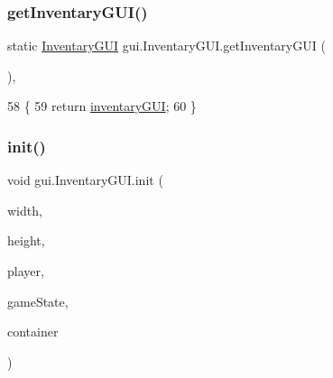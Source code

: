 \subsubsection{\texorpdfstring{get\+Inventary\+G\+U\+I()}{getInventaryGUI()}}
{\footnotesize\ttfamily static \mbox{\hyperlink{classgui_1_1_inventary_g_u_i}{Inventary\+G\+UI}} gui.\+Inventary\+G\+U\+I.\+get\+Inventary\+G\+UI (\begin{DoxyParamCaption}{ }\end{DoxyParamCaption})\hspace{0.3cm}{\ttfamily [inline]}, {\ttfamily [static]}}


\begin{DoxyCode}
58                                                  \{
59         \textcolor{keywordflow}{return} \mbox{\hyperlink{classgui_1_1_inventary_g_u_i_ac73cfdba888b575728293d9f780f3514}{inventaryGUI}};
60     \}
\end{DoxyCode}
\mbox{\label{classgui_1_1_inventary_g_u_i_a2b0a4381b602257e6c95d1522d22a243}} 
\subsubsection{\texorpdfstring{init()}{init()}}
{\footnotesize\ttfamily void gui.\+Inventary\+G\+U\+I.\+init (\begin{DoxyParamCaption}\item[{float}]{width,  }\item[{float}]{height,  }\item[{final \mbox{\hyperlink{classentities_1_1_player}{Player}}}]{player,  }\item[{\mbox{\hyperlink{classstates_1_1_game_state}{Game\+State}}}]{game\+State,  }\item[{\mbox{\hyperlink{classorg_1_1newdawn_1_1slick_1_1_game_container}{Game\+Container}}}]{container }\end{DoxyParamCaption})\hspace{0.3cm}{\ttfamily [inline]}}


